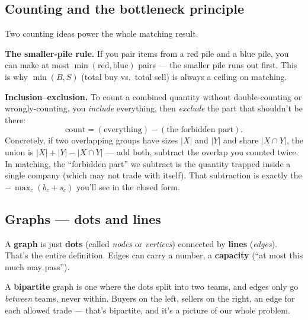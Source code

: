 \subsection{Counting and the bottleneck principle}

Two counting ideas power the whole matching result.

\textbf{The smaller-pile rule.} If you pair items from a red pile and a blue pile,
you can make at most $\min(\text{red},\text{blue})$ pairs --- the smaller pile runs
out first. This is why $\min(B,S)$ (total buy vs.\ total sell) is always a ceiling
on matching.

\textbf{Inclusion--exclusion.} To count a combined quantity without double-counting
or wrongly-counting, you \emph{include} everything, then \emph{exclude} the part
that shouldn't be there:
\[
\text{count} = (\text{everything}) - (\text{the forbidden part}).
\]
Concretely, if two overlapping groups have sizes $|X|$ and $|Y|$ and share $|X\cap
Y|$, the union is $|X|+|Y|-|X\cap Y|$ --- add both, subtract the overlap you
counted twice. In matching, the ``forbidden part'' we subtract is the quantity
trapped inside a single company (which may not trade with itself). That subtraction
is exactly the $-\,\max_c(b_c+s_c)$ you'll see in the closed form.

\subsection{Graphs --- dots and lines}

A \textbf{graph} is just \textbf{dots} (called \emph{nodes} or \emph{vertices})
connected by \textbf{lines} (\emph{edges}). That's the entire definition. Edges can
carry a number, a \textbf{capacity} (``at most this much may pass'').

A \textbf{bipartite} graph is one where the dots split into two teams, and edges
only go \emph{between} teams, never within. Buyers on the left, sellers on the
right, an edge for each allowed trade --- that's bipartite, and it's a picture of
our whole problem.

\begin{center}
\end{center}

